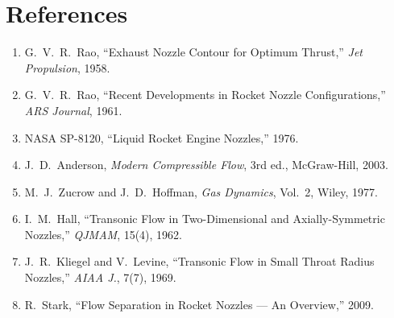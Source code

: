 \documentclass[11pt,a4paper]{article}
\begin{document}
\section{References}

\begin{enumerate}[nosep]
\item G.~V.~R.\ Rao, ``Exhaust Nozzle Contour for Optimum Thrust,'' \textit{Jet Propulsion}, 1958.
\item G.~V.~R.\ Rao, ``Recent Developments in Rocket Nozzle Configurations,'' \textit{ARS Journal}, 1961.
\item NASA SP-8120, ``Liquid Rocket Engine Nozzles,'' 1976.
\item J.~D.\ Anderson, \textit{Modern Compressible Flow}, 3rd ed., McGraw-Hill, 2003.
\item M.~J.\ Zucrow and J.~D.\ Hoffman, \textit{Gas Dynamics}, Vol.~2, Wiley, 1977.
\item I.~M.\ Hall, ``Transonic Flow in Two-Dimensional and Axially-Symmetric Nozzles,'' \textit{QJMAM}, 15(4), 1962.
\item J.~R.\ Kliegel and V.\ Levine, ``Transonic Flow in Small Throat Radius Nozzles,'' \textit{AIAA J.}, 7(7), 1969.
\item R.\ Stark, ``Flow Separation in Rocket Nozzles --- An Overview,'' 2009.
\end{enumerate}
\end{document}
